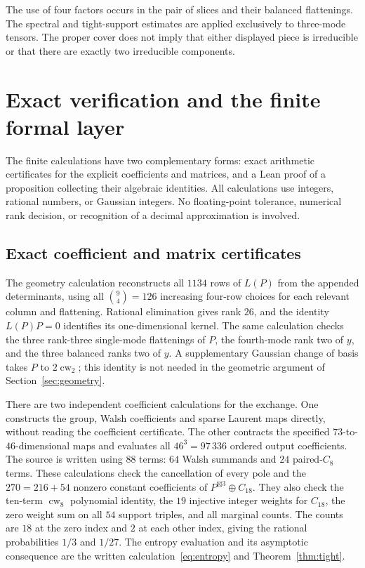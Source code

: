 \documentclass[10pt,a4paper]{article}
\theoremstyle{definition}
\theoremstyle{remark}
\numberwithin{equation}{section}
\begin{document}
The use of four factors occurs in the pair of slices and their
balanced flattenings. The spectral and tight-support estimates
are applied exclusively to three-mode tensors. The proper cover
does not imply that either displayed piece is irreducible or
that there are exactly two irreducible components.



\section{Exact verification and the finite formal layer}\label{sec:verification}
The finite calculations have two complementary forms: exact arithmetic
certificates for the explicit coefficients and matrices, and a Lean
proof of a proposition collecting their algebraic identities. All
calculations use integers, rational numbers, or Gaussian integers.
No floating-point tolerance, numerical rank decision, or recognition
of a decimal approximation is involved.

\subsection{Exact coefficient and matrix certificates}

The geometry calculation reconstructs all $1134$ rows of $L(P)$
from the appended determinants, using all $\binom94=126$ increasing
four-row choices for each relevant column and flattening. Rational
elimination gives rank $26$, and the identity $L(P)P=0$ identifies
its one-dimensional kernel. The same calculation checks the three
rank-three single-mode flattenings of $P$, the fourth-mode rank
two of $y$, and the three balanced ranks two of $y$.
A supplementary Gaussian change of basis takes $P$ to
$2\operatorname{cw}_2$; this identity is not needed in the geometric
argument of Section~\ref{sec:geometry}.

There are two independent coefficient calculations for the exchange.
One constructs the group, Walsh coefficients and sparse Laurent maps
directly, without reading the coefficient certificate. The other
contracts the specified $73$-to-$46$-dimensional maps and evaluates
all $46^3=97\,336$ ordered output coefficients. The source is written
using $88$ terms: $64$ Walsh summands and $24$ paired-$C_8$ terms.
These calculations check the cancellation of every pole and the
$270=216+54$ nonzero constant coefficients of
$P^{\boxtimes3}\oplus C_{18}$. They also check the ten-term
$\operatorname{cw}_8$ polynomial identity, the $19$ injective integer
weights for $C_{18}$, the zero weight sum on all $54$ support triples,
and all marginal counts. The counts are $18$ at the zero index
and $2$ at each other index, giving the rational probabilities
$1/3$ and $1/27$. The entropy evaluation and its asymptotic
consequence are the written calculation~\eqref{eq:entropy} and
Theorem~\ref{thm:tight}.
\end{document}
